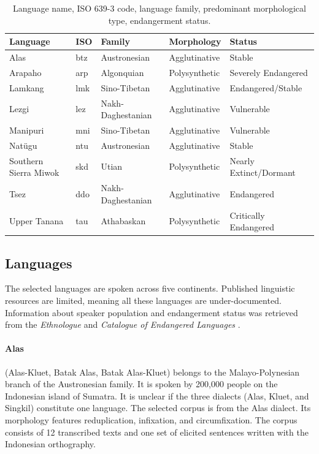\bgroup
\def\arraystretch{1.25}
\begin{table}[tb]
    \begin{center}
    \begin{tabular}{lllll} 
    \textbf{Language} & \textbf{ISO} & \textbf{Family} & \textbf{Morphology} & \textbf{Status} \\
    \hline
    Alas & btz & Austronesian & Agglutinative & Stable \\
    Arapaho & arp & Algonquian & Polysynthetic & Severely Endangered  \\
    Lamkang & lmk & Sino-Tibetan & Agglutinative & Endangered/Stable   \\
    Lezgi & lez & Nakh-Daghestanian & Agglutinative & Vulnerable \\
    Manipuri & mni & Sino-Tibetan & Agglutinative & Vulnerable  \\
    Natügu & ntu & Austronesian & Agglutinative & Stable \\
    Southern Sierra Miwok & skd & Utian & Polysynthetic & Nearly Extinct/Dormant \\ 
    Tsez & ddo & Nakh-Daghestanian & Agglutinative & Endangered \\
    Upper Tanana & tau & Athabaskan & Polysynthetic & Critically Endangered \\
	\end{tabular}
	\caption[Data]{Language name, ISO 639-3 code, language family, predominant morphological type, endangerment status.}
	\label{tab:langs}
\end{center}
\end{table}


\subsection{Languages} 

The selected languages are spoken across five continents.
Published linguistic resources are limited, meaning all these languages are under-documented. Information about speaker population and endangerment status was retrieved from the \emph{Ethnologue} \citep{eberhard_ethnologue:2020} and \emph{Catalogue of Endangered Languages} \citep{elcat_2020}.

\paragraph{Alas}
(Alas-Kluet, Batak Alas, Batak Alas-Kluet) belongs to the Malayo-Polynesian branch of the Austronesian family. It is spoken by 200,000 people on the Indonesian island of Sumatra. It is unclear if the three dialects (Alas, Kluet, and Singkil) constitute one language. The selected corpus is from the Alas dialect.  Its morphology features reduplication, infixation, and circumfixation. The corpus consists of 12 transcribed texts and one set of elicited sentences written with the Indonesian orthography. 

